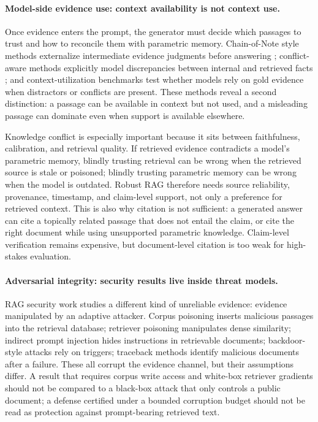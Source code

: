 \documentclass[11pt]{article}
\begin{document}
\paragraph{Model-side evidence use: context availability is not context use.}
Once evidence enters the prompt, the generator must decide which passages to trust and how to reconcile them with parametric memory. Chain-of-Note style methods externalize intermediate evidence judgments before answering \citep{chainOfNote2023}; conflict-aware methods explicitly model discrepancies between internal and retrieved facts \citep{faithfulRAG2025,astuteRAG2025}; and context-utilization benchmarks test whether models rely on gold evidence when distractors or conflicts are present. These methods reveal a second distinction: a passage can be available in context but not used, and a misleading passage can dominate even when support is available elsewhere.

Knowledge conflict is especially important because it sits between faithfulness, calibration, and retrieval quality. If retrieved evidence contradicts a model's parametric memory, blindly trusting retrieval can be wrong when the retrieved source is stale or poisoned; blindly trusting parametric memory can be wrong when the model is outdated. Robust RAG therefore needs source reliability, provenance, timestamp, and claim-level support, not only a preference for retrieved context. This is also why citation is not sufficient: a generated answer can cite a topically related passage that does not entail the claim, or cite the right document while using unsupported parametric knowledge. Claim-level verification remains expensive, but document-level citation is too weak for high-stakes evaluation.

\paragraph{Adversarial integrity: security results live inside threat models.}
RAG security work studies a different kind of unreliable evidence: evidence manipulated by an adaptive attacker. Corpus poisoning inserts malicious passages into the retrieval database; retriever poisoning manipulates dense similarity; indirect prompt injection hides instructions in retrievable documents; backdoor-style attacks rely on triggers; traceback methods identify malicious documents after a failure. These all corrupt the evidence channel, but their assumptions differ. A result that requires corpus write access and white-box retriever gradients should not be compared to a black-box attack that only controls a public document; a defense certified under a bounded corruption budget should not be read as protection against prompt-bearing retrieved text.
\end{document}
